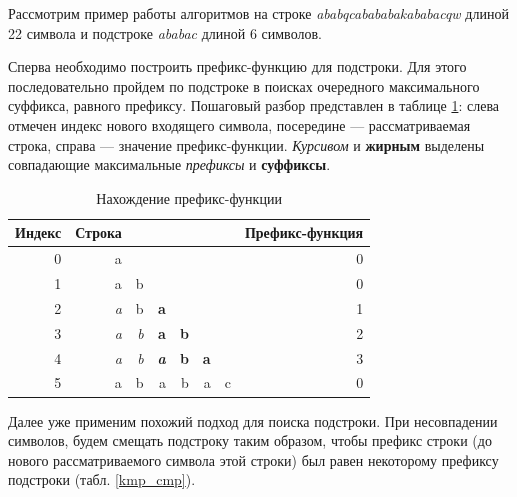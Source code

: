 \documentclass[a4paper,12pt]{article}
\begin{document}
Рассмотрим пример работы алгоритмов на
строке \textit{ababqcabababakababacqw} длиной 22 символа
и подстроке \textit{ababac} длиной 6 символов.

Сперва необходимо построить префикс-функцию для подстроки. Для этого
последовательно пройдем по подстроке в поисках очередного максимального суффикса,
равного префиксу. Пошаговый разбор представлен в таблице \ref{pref}:
слева отмечен индекс нового входящего символа, посередине ---
рассматриваемая строка, справа --- значение префикс-функции.
\textit{Курсивом} и \textbf{жирным} выделены совпадающие максимальные
\textit{префиксы} и \textbf{суффиксы}.

\begin{table} [h!]
\begin{center}
\caption{Нахождение префикс-функции}
\begin{tabular}{|r|rrrrrr|r|}
\hline
Индекс & Строка & & & & & & Префикс-функция \\
\hline
         0 &          a &            &            &            &            &            &          0 \\

         1 &          a &          b &            &            &            &            &          0 \\

         2 &    {\it a} &          b &    {\bf a} &            &            &            &          1 \\

         3 &    {\it a} &    {\it b} &    {\bf a} &    {\bf b} &            &            &          2 \\

         4 &    {\it a} &    {\it b} & {\bfseries {\itshape a}} &    {\bf b} &    {\bf a} &            &          3 \\

         5 &          a &          b &          a &          b &          a &          c &          0 \\
\hline
\end{tabular}
\label{pref}
\end{center}
\end{table}  

Далее уже применим похожий подход для поиска подстроки.
При несовпадении символов, будем смещать подстроку таким образом, чтобы 
префикс строки (до нового рассматриваемого символа этой строки) был равен
некоторому префиксу подстроки (табл. \ref{kmp_cmp}).
\end{document}
